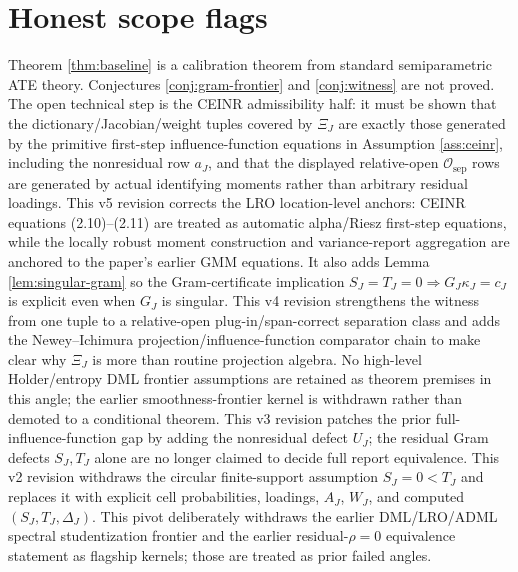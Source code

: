 \documentclass[11pt]{article}
\theoremstyle{definition}
\theoremstyle{plain}
\theoremstyle{remark}
\begin{document}
\section{Honest scope flags}
Theorem \ref{thm:baseline} is a calibration theorem from standard
semiparametric ATE theory.  Conjectures \ref{conj:gram-frontier} and
\ref{conj:witness} are not proved.  The open technical step is the CEINR
admissibility half: it must be shown that the dictionary/Jacobian/weight tuples
covered by \(\Xi_J\) are exactly those generated by the primitive
first-step influence-function equations in Assumption \ref{ass:ceinr}, including
the nonresidual row \(a_J\), and that the displayed relative-open
\(\mathcal O_{\mathrm{sep}}\) rows are generated by actual identifying moments
rather than arbitrary residual loadings.
This v5 revision corrects the LRO location-level anchors: CEINR equations
(2.10)--(2.11) are treated as automatic alpha/Riesz first-step equations, while
the locally robust moment construction and variance-report aggregation are
anchored to the paper's earlier GMM equations.  It also adds Lemma
\ref{lem:singular-gram} so the Gram-certificate implication
\(S_J=T_J=0\Rightarrow G_J\kappa_J=c_J\) is explicit even when \(G_J\) is
singular.
This v4 revision strengthens the witness from one tuple to a relative-open
plug-in/span-correct separation class and adds the Newey--Ichimura
projection/influence-function comparator chain to make clear why \(\Xi_J\) is
more than routine projection algebra.  No high-level Holder/entropy DML
frontier assumptions are retained as theorem premises in this angle; the
earlier smoothness-frontier kernel is withdrawn rather than demoted to a
conditional theorem.
This v3 revision patches the prior full-influence-function gap by adding the
nonresidual defect \(U_J\); the residual Gram defects \(S_J,T_J\) alone are no
longer claimed to decide full report equivalence.  This v2 revision withdraws the
circular finite-support assumption \(S_J=0<T_J\) and replaces it with explicit
cell probabilities, loadings, \(A_J\), \(W_J\), and computed
\((S_J,T_J,\Delta_J)\).  This pivot deliberately withdraws the earlier
DML/LRO/ADML spectral studentization frontier and the earlier residual-\(\rho=0\)
equivalence statement as flagship kernels; those are treated as prior failed
angles.
\end{document}

